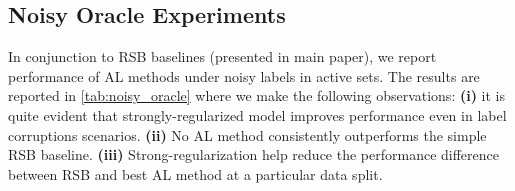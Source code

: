 \documentclass[10pt,twocolumn,letterpaper]{article}
\begin{document}
\begin{table}[h]
\begin{center}
                
                \caption{Analyzing best optimizer chosen by AutoML during random search over 50 trials for all the AL methods (VGG16 classifier) on CIFAR 10. As we implement 7 AL methods in both standard and strongly-regularized settings; so at each AL iteration we have a total of 14 best optimizers chosen.}
                \label{tab:Optim_choices}
                
                
\end{center}
\end{table}

\subsection{Noisy Oracle Experiments}
In conjunction to RSB baselines (presented in main paper), we report performance of AL methods under noisy labels in active sets. The results are reported in \cref{tab:noisy_oracle} where we make the following observations: \textbf{(i)} it is quite evident that strongly-regularized model improves performance even in label corruptions scenarios. \textbf{(ii)} No AL method consistently outperforms the simple RSB baseline. \textbf{(iii)} Strong-regularization help reduce the performance difference between RSB and best AL method at a particular data split.
\end{document}
